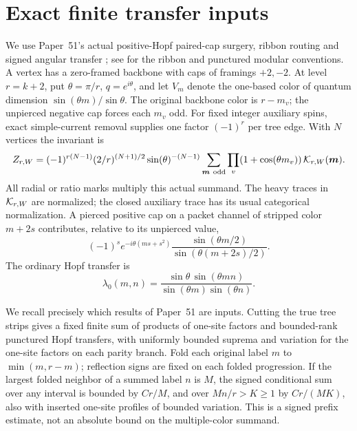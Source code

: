 \section{Exact finite transfer inputs}\label{sec:transfer}

We use Paper~51's actual positive-Hopf paired-cap surgery, ribbon routing and signed angular transfer \cite[section on actual Wilson insertions]{p51}; see \cite{rt,kir} for the ribbon and punctured modular conventions. A vertex has a zero-framed backbone with caps of framings \(+2,-2\). At level \(r=k+2\), put \(\theta=\pi/r\), \(q=e^{i\theta}\), and let \(V_m\) denote the one-based color of quantum dimension \(\sin(\theta m)/\sin\theta\). The original backbone color is \(r-m_v\); the unpierced negative cap forces each \(m_v\) odd. For fixed integer auxiliary spins, exact simple-current removal supplies one factor \((-1)^r\) per tree edge. With \(N\) vertices the invariant is
\begin{equation}\label{eq:finite}
 Z_{r,W}=(-1)^{r(N-1)}(2/r)^{(N+1)/2}\sin(\theta)^{-(N-1)}
       \sum_{\boldsymbol m\ {\rm odd}}
        \prod_v(1+\cos(\theta m_v))\,\mathcal K_{r,W}(\boldsymbol m).
\end{equation}
All radial or ratio marks multiply this actual summand. The heavy traces in \(\mathcal K_{r,W}\) are normalized; the closed auxiliary trace has its usual categorical normalization. A pierced positive cap on a packet channel of stripped color \(m+2s\) contributes, relative to its unpierced value,
\begin{equation}\label{eq:cap}
 (-1)^s e^{-i\theta(ms+s^2)}
       \frac{\sin(\theta m/2)}{\sin(\theta(m+2s)/2)} .
\end{equation}
The ordinary Hopf transfer is
\begin{equation}\label{eq:lambda}
 \lambda_0(m,n)=\frac{\sin\theta\,\sin(\theta mn)}
                        {\sin(\theta m)\sin(\theta n)} .
\end{equation}

We recall precisely which results of Paper~51 are inputs. Cutting the true tree strips gives a fixed finite sum of products of one-site factors and bounded-rank punctured Hopf transfers, with uniformly bounded suprema and variation for the one-site factors on each parity branch. Fold each original label \(m\) to \(\min(m,r-m)\); reflection signs are fixed on each folded progression. If the largest folded neighbor of a summed label \(n\) is \(M\), the signed conditional sum over any interval is bounded by \(Cr/M\), and over \(Mn/r>K\ge1\) by \(Cr/(MK)\), also with inserted one-site profiles of bounded variation. This is a signed prefix estimate, not an absolute bound on the multiple-color summand.

